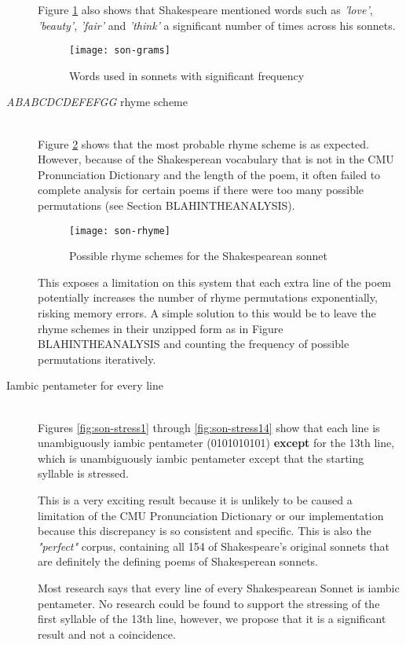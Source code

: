 \begin{description}
Figure \ref{fig:son-grams} also shows that Shakespeare mentioned words such as \textit{'love'}, \textit{'beauty'}, \textit{'fair'} and \textit{'think'} a significant number of times across his sonnets.

\begin{figure}[H]
\centering
\texttt{[image: son-grams]}
\caption{Words used in sonnets with significant frequency}
\label{fig:son-grams}
\end{figure}

\item[\textit{ABABCDCDEFEFGG} rhyme scheme]  \hfill \\
Figure \ref{fig:son-rhyme} shows that the most probable rhyme scheme is as expected. However, because of the Shakesperean vocabulary that is not in the CMU Pronunciation Dictionary and the length of the poem, it often failed to complete analysis for certain poems if there were too many possible permutations (see Section BLAHINTHEANALYSIS). 

\begin{figure}[H]
\centering
\texttt{[image: son-rhyme]}
\caption{Possible rhyme schemes for the Shakespearean sonnet}
\label{fig:son-rhyme}
\end{figure}

This exposes a limitation on this system that each extra line of the poem potentially increases the number of rhyme permutations exponentially, risking memory errors. A simple solution to this would be to leave the rhyme schemes in their unzipped form as in Figure BLAHINTHEANALYSIS and counting the frequency of possible permutations iteratively.

\item[Iambic pentameter for every line]  \hfill \\
Figures \ref{fig:son-stress1} through \ref{fig:son-stress14} show that each line is unambiguously iambic pentameter (0101010101) \textbf{except} for the 13th line, which is unambiguously iambic pentameter except that the starting syllable is stressed.

This is a very exciting result because it is unlikely to be caused a limitation of the CMU Pronunciation Dictionary or our implementation because this discrepancy is so consistent and specific. This is also the \textit{"perfect"} corpus, containing all 154 of Shakespeare's original sonnets that are definitely the defining poems of Shakesperean sonnets.

Most research says that every line of every Shakespearean Sonnet is iambic pentameter. No research could be found to support the stressing of the first syllable of the 13th line, however, we propose that it is a significant result and not a coincidence.


\end{description}
